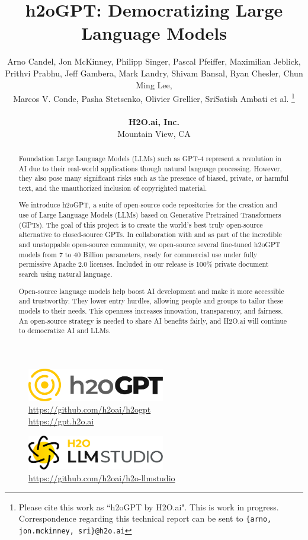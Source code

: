 \documentclass{article}
\title{h2oGPT: Democratizing Large Language Models
}
\author{
  Arno Candel, Jon McKinney, Philipp Singer, Pascal Pfeiffer, Maximilian Jeblick, \\ Prithvi Prabhu, Jeff Gambera, Mark Landry, Shivam Bansal, Ryan Chesler, Chun Ming Lee, \\ Marcos V. Conde, Pasha Stetsenko, Olivier Grellier, SriSatish Ambati et al.
  \thanks{Please cite this work as ``h2oGPT by H2O.ai". This is work in progress. Correspondence regarding this technical report can be sent to \texttt{\{arno, jon.mckinney, sri\}@h2o.ai}}\\
  \\
  \textbf{H2O.ai, Inc.}\\
  Mountain View, CA\\
}
\begin{document}
\maketitle

\begin{figure}[h]
    \centering
    \vspace{-18pt}
    \includegraphics[width=6cm]{images/h2oGPT.pdf}\\
    \vspace{2mm}
    {\large\url{https://github.com/h2oai/h2ogpt}}\\
    {\large\url{https://gpt.h2o.ai}}\\
    \vspace{10pt}
\end{figure}

\begin{figure}[h]
    \centering
    \vspace{-10pt}
    \includegraphics[width=6cm]{images/llm-studio-logo.pdf}\\
    \vspace{2mm}
    {\large\url{https://github.com/h2oai/h2o-llmstudio}}\\
    \vspace{15pt}
\end{figure}

\begin{abstract}
Foundation Large Language Models (LLMs) such as GPT-4 represent a revolution in AI due to their real-world applications though natural language processing. However, they also pose many significant risks such as the presence of biased, private, or harmful text, and the unauthorized inclusion of copyrighted material.

We introduce h2oGPT, a suite of open-source code repositories for the creation and use of Large Language Models (LLMs) based on Generative Pretrained Transformers (GPTs). The goal of this project is to create the world's best truly open-source alternative to closed-source GPTs. In collaboration with and as part of the incredible and unstoppable open-source community, we open-source several fine-tuned h2oGPT models from 7 to 40 Billion parameters, ready for commercial use under fully permissive Apache 2.0 licenses. Included in our release is 100\% private document search using natural language.

Open-source language models help boost AI development and make it more accessible and trustworthy. They lower entry hurdles, allowing people and groups to tailor these models to their needs. This openness increases innovation, transparency, and fairness. An open-source strategy is needed to share AI benefits fairly, and H2O.ai will continue to democratize AI and LLMs.

\end{abstract}
\end{document}
